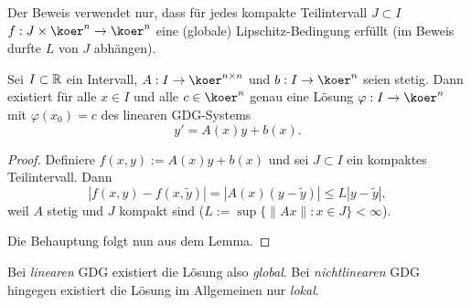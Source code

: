 \begin{rmrk}
 Der Beweis verwendet nur, dass für jedes kompakte Teilintervall $J \subset I$ $f:J \times \koer^n \to \koer^n$ eine (globale) Lipschitz-Bedingung erfüllt (im Beweis durfte $L$ von $J$ abhängen).
\end{rmrk}

\begin{thm}
 Sei $I \subset \mathbb{R}$ ein Intervall, $A: I \to \koer^{n \times n}$ und $b:I \to \koer^n$ seien stetig. Dann existiert für alle $x \in I$ und alle $c \in \koer^n$ genau eine Lösung $\varphi:I \to \koer^n$ mit $\varphi(x_0) = c$ des linearen GDG-Systems
 \[ y' = A(x) y + b(x). \]
\end{thm}

\begin{proof}
 Definiere $f(x,y) := A(x) y + b(x)$ und sei $J \subset I$ ein kompaktes Teilintervall. Dann
 \[ | f(x,y) - f(x,\tilde{y}) | = | A(x) (y-\tilde{y}) | \le L |y-\tilde{y}|, \]
 weil $A$ stetig und $J$ kompakt sind ($L := \sup \{ \|Ax\|: x \in J \} < \infty$).
 
 Die Behauptung folgt nun aus dem Lemma.
\end{proof}

\begin{rmrk}
 Bei \emph{linearen} GDG existiert die Lösung also \emph{global}. Bei \emph{nichtlinearen} GDG hingegen existiert die Lösung im Allgemeinen nur \emph{lokal}.
\end{rmrk}

